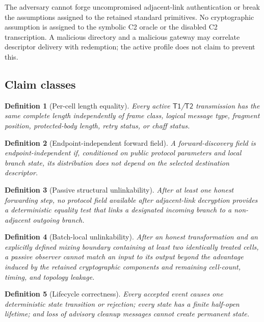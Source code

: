 \documentclass[11pt,oneside]{article}
\newcommand{\Tone}{\ensuremath{\mathsf{T1}}}
\newcommand{\Ttwo}{\ensuremath{\mathsf{T2}}}
\newtheorem{definition}{Definition}
\begin{document}
The adversary cannot forge uncompromised adjacent-link authentication or break the assumptions assigned to the retained standard primitives. No cryptographic assumption is assigned to the symbolic C2 oracle or the disabled C2 transcription. A malicious directory and a malicious gateway may correlate descriptor delivery with redemption; the active profile does not claim to prevent this.

\subsection{Claim classes}

\begin{definition}[Per-cell length equality]
Every active \Tone{}/\Ttwo{} transmission has the same complete length independently of frame class, logical message type, fragment position, protected-body length, retry status, or chaff status.
\end{definition}

\begin{definition}[Endpoint-independent forward field]
A forward-discovery field is endpoint-independent if, conditioned on public protocol parameters and local branch state, its distribution does not depend on the selected destination descriptor.
\end{definition}

\begin{definition}[Passive structural unlinkability]
After at least one honest forwarding step, no protocol field available after adjacent-link decryption provides a deterministic equality test that links a designated incoming branch to a non-adjacent outgoing branch.
\end{definition}

\begin{definition}[Batch-local unlinkability]
After an honest transformation and an explicitly defined mixing boundary containing at least two identically treated cells, a passive observer cannot match an input to its output beyond the advantage induced by the retained cryptographic components and remaining cell-count, timing, and topology leakage.
\end{definition}

\begin{definition}[Lifecycle correctness]
Every accepted event causes one deterministic state transition or rejection; every state has a finite half-open lifetime; and loss of advisory cleanup messages cannot create permanent state.
\end{definition}
\end{document}
